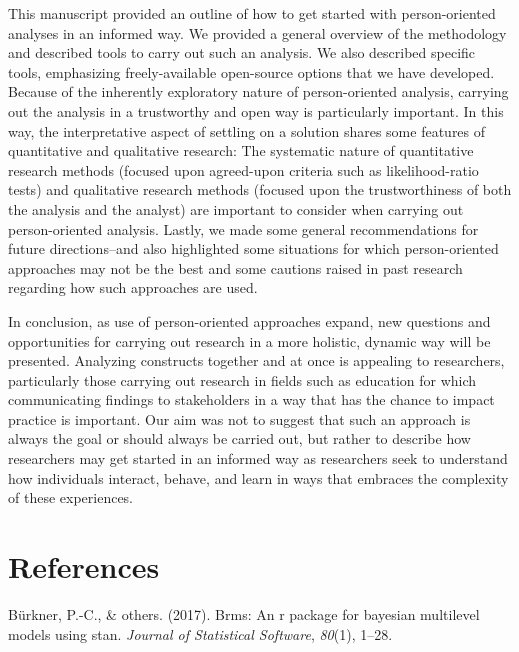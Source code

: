 \documentclass[man]{apa6}
\begin{document}
This manuscript provided an outline of how to get started with person-oriented
analyses in an informed way. We provided a general overview of the methodology
and described tools to carry out such an analysis. We also described specific
tools, emphasizing freely-available open-source options that we have developed.
Because of the inherently exploratory nature of person-oriented analysis,
carrying out the analysis in a trustworthy and open way is particularly
important. In this way, the interpretative aspect of settling on a solution
shares some features of quantitative and qualitative research: The systematic
nature of quantitative research methods (focused upon agreed-upon criteria such
as likelihood-ratio tests) and qualitative research methods (focused upon the
trustworthiness of both the analysis and the analyst) are important to consider
when carrying out person-oriented analysis. Lastly, we made some general
recommendations for future directions--and also highlighted some situations for
which person-oriented approaches may not be the best and some cautions raised in
past research regarding how such approaches are used.

In conclusion, as use of person-oriented approaches expand, new questions and
opportunities for carrying out research in a more holistic, dynamic way will be
presented. Analyzing constructs together and at once is appealing to
researchers, particularly those carrying out research in fields such as
education for which communicating findings to stakeholders in a way that has the
chance to impact practice is important. Our aim was not to suggest that such an
approach is always the goal or should always be carried out, but rather to
describe how researchers may get started in an informed way as researchers seek
to understand how individuals interact, behave, and learn in ways that embraces
the complexity of these experiences.

\newpage

\hypertarget{references}{%
\section{References}\label{references}}

\begingroup
\setlength{\parindent}{-0.5in}
\setlength{\leftskip}{0.5in}

\hypertarget{refs}{}
\leavevmode\hypertarget{ref-burkner2017}{}%
Bürkner, P.-C., \& others. (2017). Brms: An r package for bayesian multilevel models using stan. \emph{Journal of Statistical Software}, \emph{80}(1), 1--28.
\end{document}

